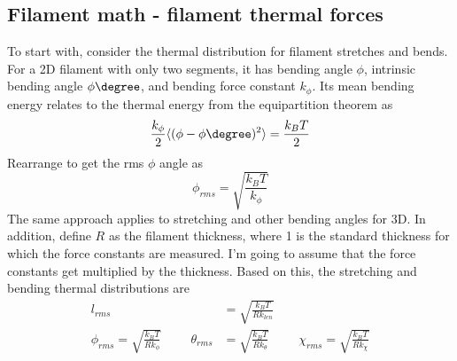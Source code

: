 \documentclass {scrbook}
\begin{document}
\subsection{Filament math - filament thermal forces}

To start with, consider the thermal distribution for filament stretches and bends. For a 2D filament with only two segments, it has bending angle $\phi$, intrinsic bending angle $\phi\degree$, and bending force constant $k_\phi$. Its mean bending energy relates to the thermal energy from the equipartition theorem as
$$\frac{k_\phi}{2} \langle(\phi-\phi\degree)^2\rangle = \frac{k_B T}{2}$$
Rearrange to get the rms $\phi$ angle as
$$\phi_{rms} = \sqrt{ \frac{k_B T}{k_\phi} }$$
The same approach applies to stretching and other bending angles for 3D. In addition, define $R$ as the filament thickness, where 1 is the standard thickness for which the force constants are measured. I'm going to assume that the force constants get multiplied by the thickness. Based on this, the stretching and bending thermal distributions are
\begin{align}
\label{eq:LengthDistribution}
l_{rms} &= \sqrt{ \frac{k_B T}{R k_{len}} } \\
\label{eq:AngleDistribution}
\phi_{rms} = \sqrt{ \frac{k_B T}{R k_{\phi}} } \hspace{1cm}
\theta_{rms} &= \sqrt{ \frac{k_B T}{R k_{\theta}} } \hspace{1cm}
\chi_{rms} = \sqrt{ \frac{k_B T}{R k_{\chi}} }
\end{align}
\end{document}
